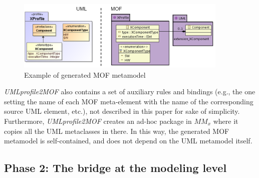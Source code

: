 %
\vspace{-.7cm}
\begin{figure}[htbp]
	\centering
		\includegraphics[width=0.90\textwidth]{figures/metamodelingExample.png}
	\caption{Example of generated MOF metamodel}
	\label{fig:metamodelingExample}
\end{figure}
\vspace{-.5cm}

\textit{UMLprofile2MOF} also contains a set of auxiliary rules and bindings (e.g., the one setting the name of each MOF meta-element with the name of the corresponding source UML element, etc.), not described in this paper for sake of simplicity. Furthermore, \textit{UMLprofile2MOF} creates an ad-hoc package in $MM_x$ where it copies all the UML metaclasses in there. In this way, the generated MOF metamodel is self-contained, and does not depend on the UML metamodel itself.

\subsection{Phase 2: The bridge at the modeling level}\label{sec:modeLevel}

